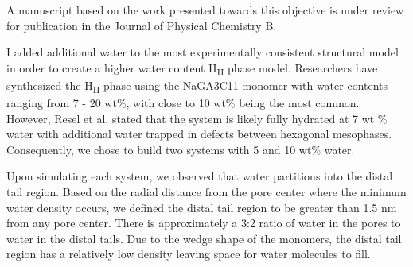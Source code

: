\documentclass{article}
\begin{document}
  \noindent A manuscript based on the work presented towards this objective is under 
  review for publication in the Journal of Physical Chemistry B.

  I added additional water to the most experimentally consistent structural
  model in order to create a higher water content H\textsubscript{II} phase
  model. Researchers have synthesized the H\textsubscript{II} phase using 
  the NaGA3C11 monomer with water contents ranging from 7 - 20 wt\%, with 
  close to 10 wt\% being the most common.~\cite{smith_ordered_1997,zhou_supported_2005} 
  However, Resel et al. stated that the system is likely fully hydrated at
  7 wt \% water with additional water trapped in defects between hexagonal
  mesophases.~\cite{resel_structural_2000} Consequently, we chose to build
  two systems with 5 and 10 wt\% water.
  
  Upon simulating each system, we observed that water partitions into the
  distal tail region. Based on the radial distance from the pore center where 
  the minimum water density occurs, we defined the distal tail region to 
  be greater than 1.5 nm from any pore center. There is approximately a 3:2
  ratio of water in the pores to water in the distal tails. Due to the wedge
  shape of the monomers, the distal tail region has a relatively low density
  leaving space for water molecules to fill.
  
\end{document}

